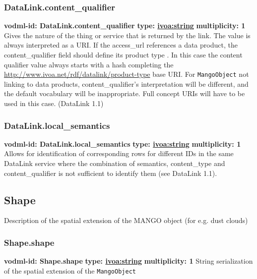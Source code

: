     \subsubsection{DataLink.content\_qualifier}
    \textbf{vodml-id: DataLink.content\_qualifier} \newline
    \textbf{type: \hyperref[sect:ivoa]{ivoa:string}} \newline
    \textbf{multiplicity: 1} \newline
    Gives the nature of the thing or service that is returned by the link. The value is always interpreted as a URI. If the access\_url references a data product, the content\_qualifier field should define its product type . In this case the content qualifier value always starts with a hash completing the \url{http://www.ivoa.net/rdf/datalink/product-type} base URI. For \texttt{MangoObject} not linking to data products, content\_qualifier’s interpretation will be different, and the default vocabulary will be inappropriate. Full concept URIs will have to be used in this case. (DataLink 1.1)

    \subsubsection{DataLink.local\_semantics}
    \textbf{vodml-id: DataLink.local\_semantics} \newline
    \textbf{type: \hyperref[sect:ivoa]{ivoa:string}} \newline
    \textbf{multiplicity: 1} \newline
    Allows for identification of corresponding rows for different IDs in the same DataLink service where the combination of semantics, content\_type and content\_qualifier is not sufficient to identify them (see DataLink 1.1).

  \subsection{Shape}
    \label{sect:Shape}
    Description of the spatial extension of the MANGO object (for e.g. dust clouds)

    \subsubsection{Shape.shape}
    \textbf{vodml-id: Shape.shape} \newline
    \textbf{type: \hyperref[sect:ivoa]{ivoa:string}} \newline
    \textbf{multiplicity: 1} \newline
    String serialization of the spatial extension of the \texttt{MangoObject}

